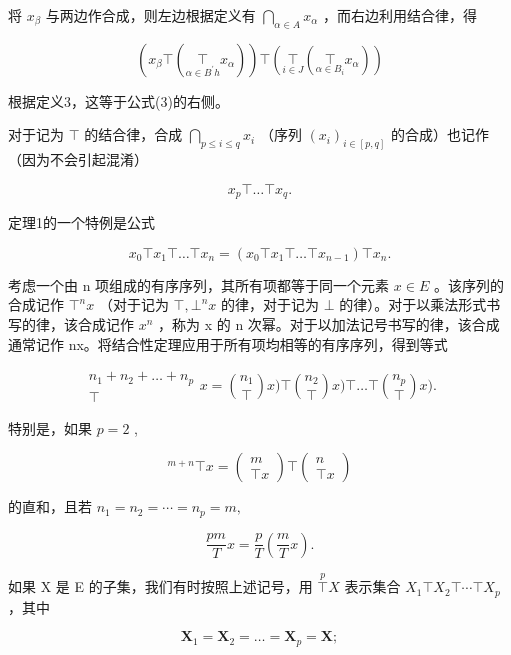 将 \(x_{\beta}\) 与两边作合成，则左边根据定义有 \(\bigcap_{\alpha \in A} x_{\alpha}\) ，而右边利用结合律，得

\[
\left(x _ {\beta} \top \left(\underset {\alpha \in B ^ {\prime} h} {\top} x _ {\alpha}\right)\right) \top \left(\underset {i \in J} {\top} \left(\underset {\alpha \in B _ {i}} {\top} x _ {\alpha}\right)\right)
\]

根据定义3，这等于公式(3)的右侧。

对于记为 \(\top\) 的结合律，合成 \(\bigcap_{p\leqslant i\leqslant q}x_i\) （序列 \((x_i)_{i\in [p,q]}\) 的合成）也记作（因为不会引起混淆）

\[
x _ {p} \top \dots \top x _ {q}.
\]

定理1的一个特例是公式

\[
x _ {0} \top x _ {1} \top \dots \top x _ {n} = (x _ {0} \top x _ {1} \top \dots \top x _ {n - 1}) \top x _ {n}.
\]

考虑一个由 n 项组成的有序序列，其所有项都等于同一个元素 \(x \in E\) 。该序列的合成记作 \(\top^{n} x\) （对于记为 \(\top, \bot^{n} x\) 的律，对于记为 \(\bot\) 的律）。对于以乘法形式书写的律，该合成记作 \(x^{n}\) ，称为 x 的 n 次幂。对于以加法记号书写的律，该合成通常记作 nx。将结合性定理应用于所有项均相等的有序序列，得到等式

\[
\begin{array}{c} n _ {1} + n _ {2} + \dots + n _ {p} \\ \top \end{array} x = \binom {n _ {1}} {\top} x) \top \binom {n _ {2}} {\top} x) \top \dots \top \binom {n _ {p}} {\top} x).
\]

特别是，如果 \(p = 2\) ,

\[
{ } ^ { m + n } \top x = \left( \begin{array} { c } m \\ \top x \end{array} \right) \top \left( \begin{array} { c } n \\ \top x \end{array} \right)\tag{4}
\]

的直和，且若 \(n_1 = n_2 = \cdots = n_p = m,\)

\[
\frac {p m}{T} x = \frac {p}{T} \left(\frac {m}{T} x\right).\tag{5}
\]

如果 X 是 E 的子集，我们有时按照上述记号，用 \(\overset{p}{\top}X\) 表示集合 \(X_{1}\top X_{2}\top\cdots\top X_{p}\) ，其中

\[
\mathbf {X} _ {1} = \mathbf {X} _ {2} = \dots = \mathbf {X} _ {p} = \mathbf {X};
\]

